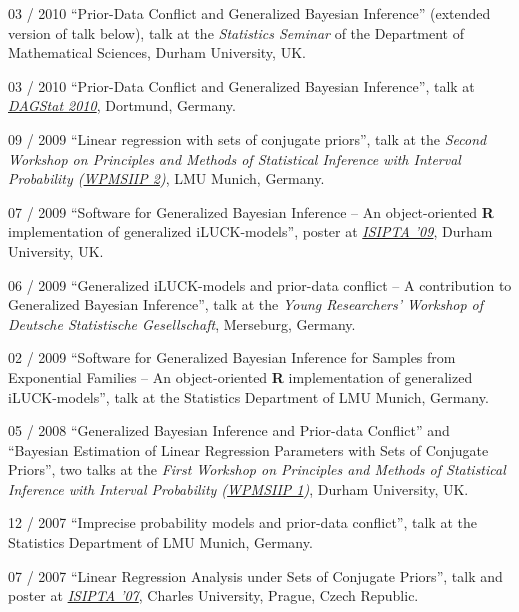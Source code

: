 \documentclass[a4paper]{simplecv}
\begin{document}
\begin{topic}
\item[03 / 2010] ``Prior-Data Conflict and Generalized Bayesian Inference'' (extended version of talk below), talk at the
                 \emph{Statistics Seminar} of the Department of Mathematical Sciences, Durham University, UK.

\item[03 / 2010] ``Prior-Data Conflict and Generalized Bayesian Inference'', talk at
                 \emph{\href{http://www.statistik.tu-dortmund.de/DAGStat2010/en/index.html}{DAGStat 2010}}, Dortmund, Germany.

\item[09 / 2009] ``Linear regression with sets of conjugate priors'', talk at the
                 \emph{Second Workshop on Principles and Methods of Statistical Inference with Interval Probability (\href{http://www.stat.uni-muenchen.de/~walter/workshop0909/}{WPMSIIP 2})}, LMU Munich, Germany.

\item[07 / 2009] ``Software for Generalized Bayesian Inference -- An object-oriented \textbf{R} implementation of generalized iLUCK-models'', poster at
                 \emph{\href{http://www.sipta.org/isipta09/}{ISIPTA '09}}, Durham University, UK.

\item[06 / 2009] ``Generalized iLUCK-models and prior-data conflict -- A contribution to Generalized Bayesian Inference'', talk at the
                 \emph{Young Researchers' Workshop of Deutsche Statistische Gesellschaft}, Merseburg, Germany.

\item[02 / 2009] ``Software for Generalized Bayesian Inference for Samples from Exponential Families -- An object-oriented \textbf{R} implementation of generalized iLUCK-models'', talk at
                 the Statistics Department of LMU Munich, Germany.

\item[05 / 2008] ``Generalized Bayesian Inference and Prior-data Conflict'' and ``Bayesian Estimation of Linear Regression Parameters with Sets of Conjugate Priors'', two talks at the
                 \emph{First Workshop on Principles and Methods of Statistical Inference with Interval Probability (\href{http://www.maths.dur.ac.uk/users/matthias.troffaes/workshopip2008/index.html}{WPMSIIP 1})}, Durham University, UK.

\item[12 / 2007] ``Imprecise probability models and prior-data conflict'', talk at
                 the Statistics Department of LMU Munich, Germany.

\item[07 / 2007] ``Linear Regression Analysis under Sets of Conjugate Priors'', talk and poster at
                 \emph{\href{http://www.sipta.org/isipta07/}{ISIPTA '07}}, Charles University, Prague, Czech Republic.

\end{topic}
\end{document}

